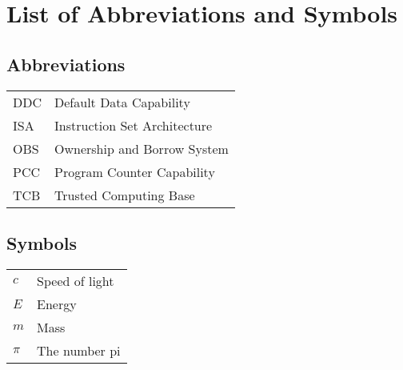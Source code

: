 \documentclass[master=cws,masteroption=vs]{kulemt}
\begin{document}
\chapter{List of Abbreviations and Symbols}
\section*{Abbreviations}
\begin{flushleft}
  \renewcommand{\arraystretch}{1.1}
  \begin{tabularx}{\textwidth}{@{}p{12mm}X@{}}
    DDC   & Default Data Capability \\
    ISA   & Instruction Set Architecture \\
    OBS   & Ownership and Borrow System \\
    PCC   & Program Counter Capability \\
    TCB   & Trusted Computing Base \\
  \end{tabularx}
\end{flushleft}
\section*{Symbols}
\begin{flushleft}
  \renewcommand{\arraystretch}{1.1}
  \begin{tabularx}{\textwidth}{@{}p{12mm}X@{}}
    $c$   & Speed of light \\
    $E$   & Energy \\
    $m$   & Mass \\
    $\pi$ & The number pi \\
  \end{tabularx}
\end{flushleft}

\mainmatter










\appendixpage*          %
\appendix



\backmatter


\end{document}
